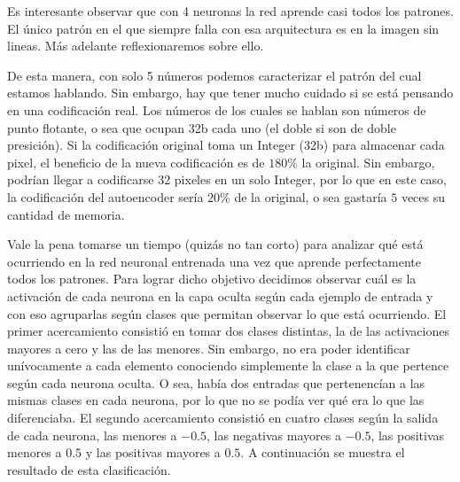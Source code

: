 \documentclass[12pt]{article}
\begin{document}
Es interesante observar que con 4 neuronas la red aprende casi todos los patrones. El único patrón en el que siempre falla con esa arquitectura es en la imagen sin lineas. Más adelante reflexionaremos sobre ello.

De esta manera, con solo 5 números podemos caracterizar el patrón del cual estamos hablando. Sin embargo, hay que tener mucho cuidado si se está pensando en una codificación real. Los números de los cuales se hablan son números de punto flotante, o sea que ocupan 32b cada uno (el doble si son de doble presición). Si la codificación original toma un Integer (32b) para almacenar cada pixel, el beneficio de la nueva codificación es de $180\%$ la original. Sin embargo, podrían llegar a codificarse 32 pixeles en un solo Integer, por lo que en este caso, la codificación del autoencoder sería $20\%$ de la original, o sea gastaría $5$ veces su cantidad de memoria. 

Vale la pena tomarse un tiempo (quizás no tan corto) para analizar qué está ocurriendo en la red neuronal entrenada una vez que aprende perfectamente todos los patrones. Para lograr dicho objetivo decidimos observar cuál es la activación de cada neurona en la capa oculta según cada ejemplo de entrada y con eso agruparlas según clases que permitan observar lo que está ocurriendo. El primer acercamiento consistió en tomar dos clases distintas, la de las activaciones mayores a cero y las de las menores. Sin embargo, no era poder identificar unívocamente a cada elemento conociendo simplemente la clase a la que pertence según cada neurona oculta. O sea, había dos entradas que pertenencían a las mismas clases en cada neurona, por lo que no se podía ver qué era lo que las diferenciaba. El segundo acercamiento consistió en cuatro clases según la salida de cada neurona, las menores a $-0.5$, las negativas mayores a $-0.5$, las positivas menores a $0.5$ y las positivas mayores a $0.5$. A continuación se muestra el resultado de esta clasificación.
\end{document}
